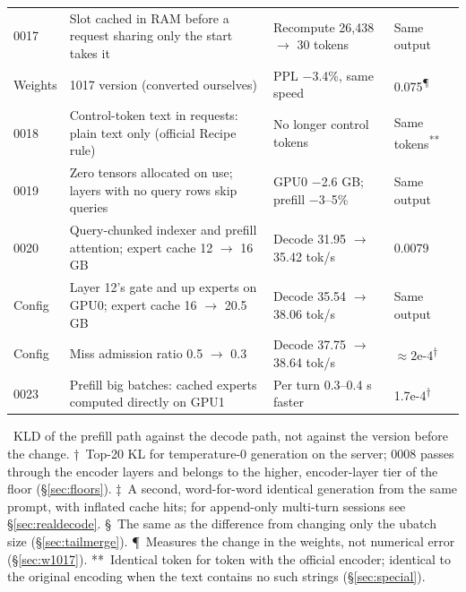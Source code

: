\documentclass[11pt,a4paper]{article}
\newcommand{\tps}{tok/s}
\begin{document}
\begin{table}[!tp]
\begin{tabularx}{\textwidth}{@{}l X l l@{}}
    0017 & Slot cached in RAM before a request sharing only the start takes it & Recompute 26,438 $\to$ 30 tokens & Same output \\
    Weights & 1017 version (converted ourselves) & PPL $-$3.4\%, same speed & 0.075\textsuperscript{¶} \\
    0018 & Control-token text in requests: plain text only (official Recipe rule) & No longer control tokens & Same tokens\textsuperscript{**} \\
    0019 & Zero tensors allocated on use; layers with no query rows skip queries & GPU0 $-$2.6 GB; prefill $-$3--5\% & Same output \\
    0020 & Query-chunked indexer and prefill attention; expert cache 12 $\to$ 16 GB & Decode 31.95 $\to$ 35.42 \tps{} & 0.0079 \\
    Config & Layer 12's gate and up experts on GPU0; expert cache 16 $\to$ 20.5 GB & Decode 35.54 $\to$ 38.06 \tps{} & Same output \\
    Config & Miss admission ratio 0.5 $\to$ 0.3 & Decode 37.75 $\to$ 38.64 \tps{} & $\approx 2$e-4\textsuperscript{†} \\
    0023 & Prefill big batches: cached experts computed directly on GPU1 & Per turn 0.3--0.4 s faster & 1.7e-4\textsuperscript{†} \\
    \bottomrule
  \end{tabularx}
  \par\smallskip\raggedright\footnotesize *\ KLD of the prefill path against the decode path, not against the version before the change. †\ Top-20 KL for temperature-0 generation on the server; 0008 passes through the encoder layers and belongs to the higher, encoder-layer tier of the floor (\S\ref{sec:floors}). ‡\ A second, word-for-word identical generation from the same prompt, with inflated cache hits; for append-only multi-turn sessions see \S\ref{sec:realdecode}. §\ The same as the difference from changing only the ubatch size (\S\ref{sec:tailmerge}). ¶\ Measures the change in the weights, not numerical error (\S\ref{sec:w1017}). **\ Identical token for token with the official encoder; identical to the original encoding when the text contains no such strings (\S\ref{sec:special}).
\end{table}
\end{document}
